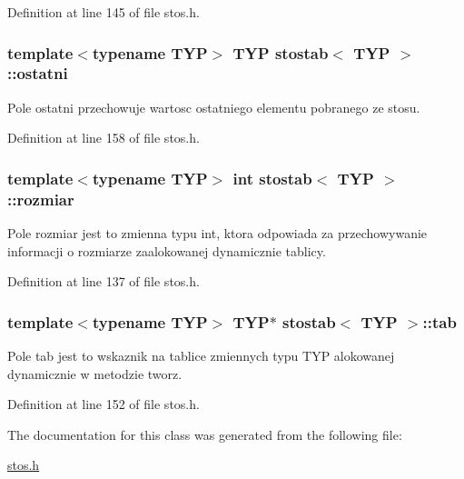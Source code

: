 Definition at line 145 of file stos.\-h.

\hypertarget{classstostab_a52a63ea67f972826bfec6709d69c0e8d}{
\subsubsection[{ostatni}]{\setlength{\rightskip}{0pt plus 5cm}template$<$typename T\-Y\-P$>$ T\-Y\-P {\bf stostab}$<$ T\-Y\-P $>$\-::ostatni}}\label{classstostab_a52a63ea67f972826bfec6709d69c0e8d}
Pole ostatni przechowuje wartosc ostatniego elementu pobranego ze stosu. 

Definition at line 158 of file stos.\-h.

\hypertarget{classstostab_a5b43739b2e4cc4ac4f60e6b23687c08a}{
\subsubsection[{rozmiar}]{\setlength{\rightskip}{0pt plus 5cm}template$<$typename T\-Y\-P$>$ int {\bf stostab}$<$ T\-Y\-P $>$\-::rozmiar}}\label{classstostab_a5b43739b2e4cc4ac4f60e6b23687c08a}
Pole rozmiar jest to zmienna typu int, ktora odpowiada za przechowywanie informacji o rozmiarze zaalokowanej dynamicznie tablicy. 

Definition at line 137 of file stos.\-h.

\hypertarget{classstostab_ad0b2249981a482f6217f3f4c8f1aab55}{
\subsubsection[{tab}]{\setlength{\rightskip}{0pt plus 5cm}template$<$typename T\-Y\-P$>$ T\-Y\-P$\ast$ {\bf stostab}$<$ T\-Y\-P $>$\-::tab}}\label{classstostab_ad0b2249981a482f6217f3f4c8f1aab55}
Pole tab jest to wskaznik na tablice zmiennych typu T\-Y\-P alokowanej dynamicznie w metodzie tworz. 

Definition at line 152 of file stos.\-h.



The documentation for this class was generated from the following file\-:\begin{DoxyCompactItemize}
\item 
\hyperlink{stos_8h}{stos.\-h}\end{DoxyCompactItemize}
